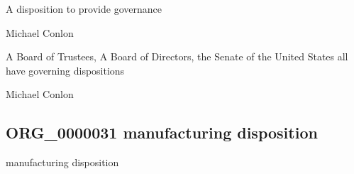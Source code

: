 \documentclass[letterpaper,10pt,english]{sphinxmanual}
\begin{document}
\begin{sphinxShadowBox}

\sphinxAtStartPar
{\hyperref[\detokenize{doc-BFO_0000016::doc}]{}}
\end{sphinxShadowBox}

\begin{sphinxShadowBox}

\sphinxAtStartPar
A disposition to provide governance
\end{sphinxShadowBox}

\begin{sphinxShadowBox}

\sphinxAtStartPar
Michael Conlon 
\end{sphinxShadowBox}

\begin{sphinxShadowBox}

\sphinxAtStartPar
A Board of Trustees, A Board of Directors, the Senate of the United States all have governing dispositions
\end{sphinxShadowBox}

\begin{sphinxShadowBox}

\sphinxAtStartPar
Michael Conlon 
\end{sphinxShadowBox}
\begin{quote}

\ignorespaces \end{quote}


\subsection{ORG\_0000031 \sphinxhyphen{} manufacturing disposition}
\label{\detokenize{doc-ORG_0000031:org-0000031-manufacturing-disposition}}\label{\detokenize{doc-ORG_0000031:index-0}}\label{\detokenize{doc-ORG_0000031::doc}}
\begin{sphinxShadowBox}

\sphinxAtStartPar
manufacturing disposition
\end{sphinxShadowBox}
\end{document}
